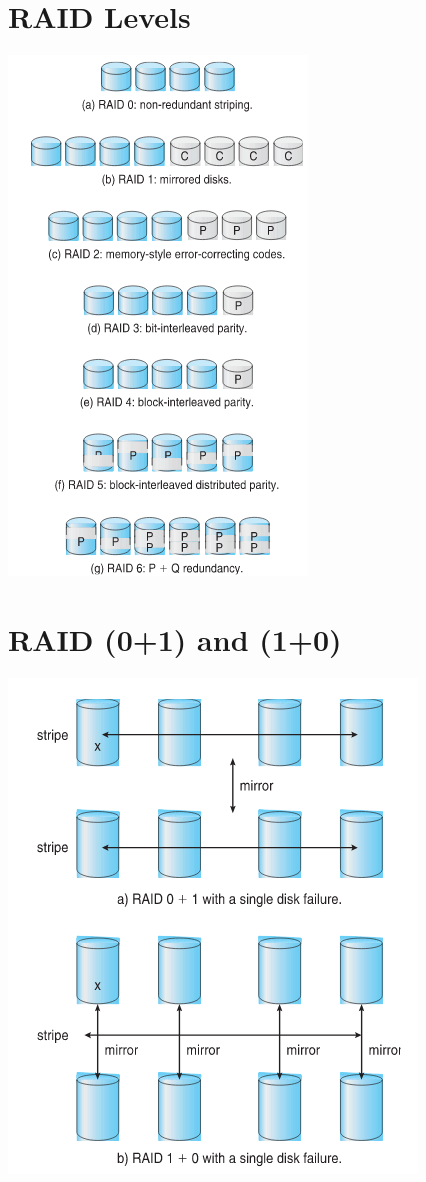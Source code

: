 \documentclass{article}[18pt]
\begin{document}
\section{RAID Levels}
\begin{center}
	\includegraphics[scale=0.7]{"Raid Levels"}
\end{center}
\section{RAID (0+1) and (1+0)}
\begin{center}
	\includegraphics[scale=0.7]{RAID01}
\end{center}
\end{document}
